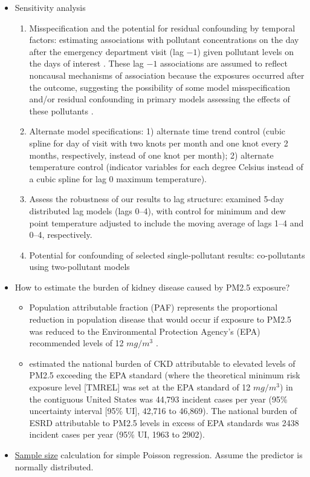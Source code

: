 \documentclass{article}
\begin{document}
\begin{itemize}
{\begin{itemize}
        \end{itemize}
    }
    \item Sensitivity analysis {
        \begin{enumerate}
            \item Misspecification and the potential for residual confounding by temporal factors: estimating associations with pollutant concentrations on the day after the emergency department visit (lag $-1$) given pollutant levels on the days of interest \citep{flanders2011method}. These lag $-1$ associations are assumed to reflect noncausal mechanisms of association because the exposures occurred after the outcome, suggesting the possibility of some model misspecification and/or residual confounding in primary models assessing the effects of these pollutants \citep{flanders2011method}.
            \item Alternate model specifications: 1) alternate time trend control (cubic spline for day of visit with two knots per month and one knot every 2 months, respectively, instead of one knot per month); 2) alternate temperature control (indicator variables for each degree Celsius instead of a cubic spline for lag 0 maximum temperature).
            \item Assess the robustness of our results to lag structure: examined 5-day distributed lag models (lags 0--4), with control for minimum and dew point temperature adjusted to include the moving average of lags 1--4 and 0--4, respectively.
            \item Potential for confounding of selected single-pollutant results: co-pollutants using two-pollutant models
        \end{enumerate}
    }
    \item How to estimate the burden of kidney disease caused by PM2.5 exposure? {
        \begin{itemize}
            \item Population attributable fraction (PAF) represents the proportional reduction in population disease that would occur if exposure to PM2.5 was reduced to the Environmental Protection Agency's (EPA) recommended levels of 12 $mg/m^3$ \citep{bowe2018particulate}.
            \item \citet{bowe2018particulate} estimated the national burden of CKD attributable to elevated levels of PM2.5 exceeding the EPA standard (where the theoretical minimum risk exposure level [TMREL] was set at the EPA standard of 12 $mg/m^3$) in the contiguous United States was 44,793 incident cases per year (95\% uncertainty interval [95\% UI], 42,716 to 46,869). The national burden of ESRD attributable to PM2.5 levels in excess of EPA standards was 2438 incident cases per year (95\% UI, 1963 to 2902). 
        \end{itemize}
    }
    \item \href{https://rdrr.io/cran/powerMediation/man/sizePoisson.html}{Sample size} calculation for simple Poisson regression. Assume the predictor is normally distributed. {
       
}
\end{itemize}
\end{document}
